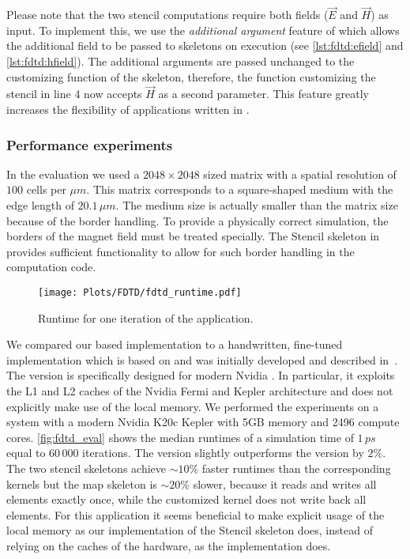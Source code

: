 Please note that the two stencil computations require both fields ($\vec{E}$ and $\vec{H}$) as input.
To implement this, we use the \emph{additional argument} feature of \SkelCL which allows the additional field to be passed to skeletons on execution (see \autoref{lst:fdtd:efield} and \autoref{lst:fdtd:hfield}).
The additional arguments are passed unchanged to the customizing function of the skeleton, therefore, the function customizing the stencil in line 4 now accepts $\vec{H}$ as a second parameter.
This feature greatly increases the flexibility of applications written in \SkelCL.


\subsubsection*{Performance experiments}

In the evaluation we used a $2048 \times 2048$ sized matrix with a spatial resolution of $100$ cells per $\mu m$.
This matrix corresponds to a square-shaped medium with the edge length of $20.1\,\mu m$.
The medium size is actually smaller than the matrix size because of the border handling.
To provide a physically correct simulation, the borders of the magnet field must be treated specially.
The Stencil skeleton in \SkelCL provides sufficient functionality to allow for such border handling in the computation code.

\begin{figure}[t]
    \centering
    \texttt{[image: Plots/FDTD/fdtd\_runtime.pdf]}
    \caption{Runtime for one iteration of the \FDTD application.}
    \label{fig:fdtd_eval}
\end{figure}

We compared our \SkelCL based implementation to a handwritten, fine-tuned \OpenCL implementation which is based on \cite{Knitter2013} and was initially developed and described in~\cite{Haidl2011}.
The \OpenCL version is specifically designed for modern Nvidia \GPUs.
In particular, it exploits the L1 and L2 caches of the Nvidia Fermi and Kepler architecture and does not explicitly make use of the local memory.
We performed the experiments on a system with a modern Nvidia K20c Kepler \GPU with 5GB memory and 2496 compute cores.
\autoref{fig:fdtd_eval} shows the median runtimes of a simulation time of $1\,ps$ equal to $60\, 000$ iterations.
The \SkelCL version slightly outperforms the \OpenCL version by $2\%$.
The two stencil skeletons achieve ${\sim}10\%$ faster runtimes than the corresponding \OpenCL kernels but the map skeleton is ${\sim}20\%$ slower, because it reads and writes all elements exactly once, while the customized \OpenCL kernel does not write back all elements.
For this application it seems beneficial to make explicit usage of the local memory as our implementation of the Stencil skeleton does, instead of relying on the caches of the hardware, as the \OpenCL implementation does.
